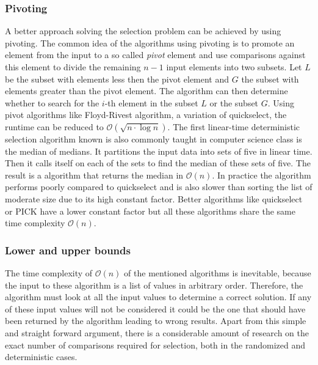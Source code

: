 \documentclass[10pt,journal,compsoc]{IEEEtran}
\begin{document}
\subsubsection{Pivoting}
A better approach solving the selection problem can be achieved by using pivoting. The common idea
of the algorithms using pivoting is to promote an element from the input to a so called
\textit{pivot} element and use comparisons against this element to divide the remaining $n-1$ input
elements into two subsets. Let $L$ be the subset with elements less then the pivot element and $G$
the subset with elements greater than the pivot element. The algorithm can then determine whether to
search for the $i$-th element in the subset $L$ or the subset $G$. Using pivot algorithms like
Floyd-Rivest algorithm, a variation of quickselect, the runtime can be reduced to
$\mathcal{O}(\sqrt{n \cdot \log n})$. The first linear-time deterministic selection algorithm known
is  also commonly taught in computer science class is the median of medians. It partitions the input
data into sets of five in linear time. Then it calls itself on each of the sets to find the median
of these sets of five. The result is a algorithm that returns the median in $\mathcal{O}(n)$. In
practice the algorithm performs poorly compared to quickselect and is also slower than sorting the
list of moderate size due to its high constant factor. Better algorithms like quickselect or PICK
have a lower constant factor but all these algorithms share the same time complexity
$\mathcal{O}(n)$.

\subsubsection{Lower and upper bounds}
The time complexity of $\mathcal{O}(n)$ of the mentioned algorithms is inevitable, because the input
to these algorithm is a list of values in arbitrary order. Therefore, the algorithm must look at all
the input values to determine a correct solution. If any of these input values will not be
considered it could be the one that should have been returned by the algorithm leading to wrong
results. Apart from this simple and straight forward argument, there is a considerable amount of
research on the exact number of comparisons required for selection, both in the randomized and
deterministic cases.
\end{document}
